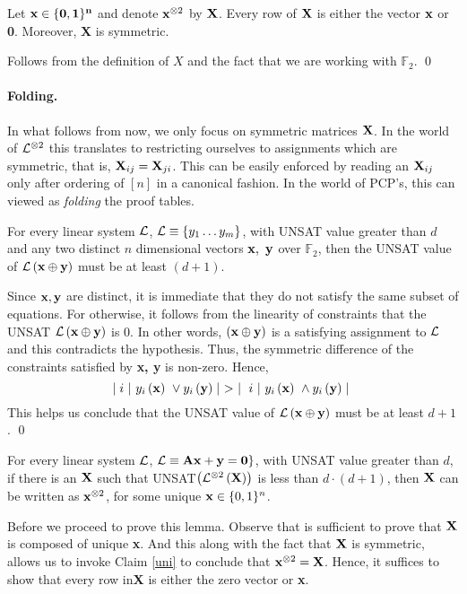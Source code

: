 {\begin{claim}\label{uni}
  Let ${\bf x \in \{0,1\}^n}$ and denote ${\bf x}^{\otimes 2}$ by
  ${\bf X}$. Every row of ${\bf X}$ is either the vector ${\bf x}$ or
  {\bf 0}. Moreover, {\bf X} is symmetric.
\end{claim}
 Follows from the definition of $X$ and
the fact that we are working with $\mathbb{F}_2$.  \qed

 
\paragraph{Folding.} In what follows from now, we only focus on
symmetric matrices ${\bf X}$. In the world of ${\cal L}^{\otimes 2}$ this
translates to restricting ourselves to assignments which are
symmetric, that is, ${\bf X}_{ij} = {\bf X}_{ji}$. This can be easily
enforced by reading an ${\bf X}_{ij}$ only after ordering of $[n]$ in
a canonical fashion. In the world of PCP's, this can viewed as {\em
  folding} the proof tables.


\begin{lemma}\label{unique}
  For every linear system ${\cal L}$, ${\cal L} \equiv \{y_1 \ldots y_m\}$, with
  UNSAT value greater than $d$ and any two distinct $n$ dimensional
  vectors ${\bf x},\ {\bf y}$ over $\mathbb{F}_2$, then the UNSAT
  value of ${\cal L}\left({\bf x} \oplus {\bf y}\right)$ must be at least
  $(d+ 1)$.
\end{lemma}
 Since ${\bf x, y}$ are distinct, it is
immediate that they do not satisfy the same subset of equations.  For
otherwise, it follows from the linearity of constraints that the UNSAT
${\cal L}\left({\bf x} \oplus {\bf y}\right)$ is $0$.  In other words,
$\left({\bf x} \oplus {\bf y}\right)$ is a satisfying assignment to
${\cal L}$ and this contradicts the hypothesis. Thus, the symmetric
difference of the constraints satisfied by {\bf x, y} is
non-zero. Hence,
\[
      \mid i\ \vert \ y_i\left({\bf x}\right) \ \vee y_i\left({\bf y}\right) \mid \ > \ \mid \ i \ \vert \  y_i\left({\bf x}\right) \ \wedge y_i\left({\bf y}\right) \mid \\
\]
This helps us conclude that the UNSAT value of ${\cal L}\left({\bf x}
  \oplus {\bf y}\right)$ must be at least ${d+ 1}$. \qed


\begin{lemma}\label{decode1}
  For every linear system ${\cal L}$, ${\cal L} \equiv {\bf Ax + y} = {\bf
    0}\}$, with UNSAT value greater than $d$, if there is an ${\bf X}$
  such that UNSAT$\left({\cal L}^{\otimes 2}\left({\bf X}\right)\right)$ is
  less than $d \cdot (d+1)$, then ${\bf X}$ can be written
  as ${\bf x}^{\otimes 2}$, for some unique ${\bf x} \in \{0,1\}^n$.
\end{lemma}
 Before we proceed to prove this lemma. Observe
that is sufficient to prove that ${\bf X}$ is composed of unique {\bf
  x}. And this along with the fact that ${\bf X}$ is symmetric, allows
us to invoke Claim \ref{uni} to conclude that ${\bf x}^{\otimes 2} =
{\bf X}$. Hence, it suffices to show that every row in{\bf X} is
either the zero vector or {\bf x}.

}
